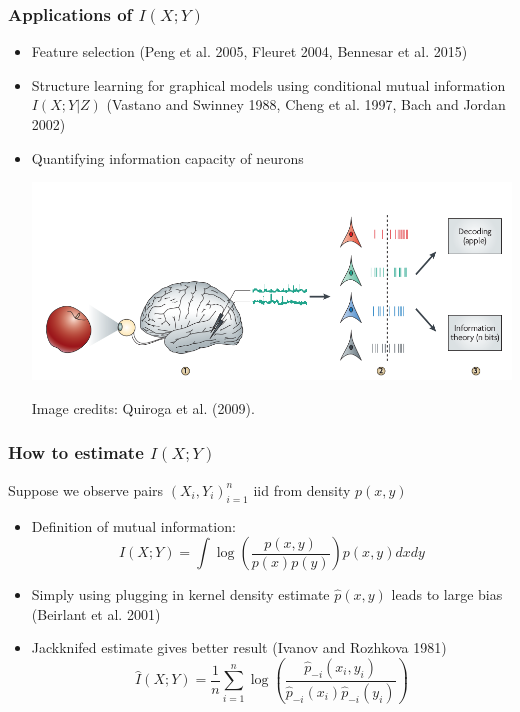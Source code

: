 \documentclass{beamer}
\begin{document}
\begin{frame}
\frametitle{Applications of $I(X; Y)$} 
\begin{itemize}
\item Feature selection (Peng et al. 2005, Fleuret 2004, Bennesar et al. 2015)
\item Structure learning for graphical models using conditional mutual information $I(X; Y|Z)$
(Vastano and Swinney 1988, Cheng et al. 1997, Bach and Jordan 2002)
\item Quantifying information capacity of neurons
\begin{center}
\includegraphics[scale = 0.2]{quiroga.png}
\end{center}
\tiny{Image credits: Quiroga et al. (2009).}
\end{itemize}
\end{frame}

\begin{frame}
\frametitle{How to estimate $I(X; Y)$}
Suppose we observe pairs $(X_i,Y_i)_{i=1}^n$ iid from density $p(x, y)$
\begin{itemize}
\item Definition of mutual information:
\[
I(X; Y) = \int \log \left(\frac{p(x, y)}{p(x)p(y)}\right) p(x, y) dx dy
\]
\item Simply using plugging in kernel density estimate $\hat{p}(x, y)$ leads to large bias (Beirlant et al. 2001)
\item Jackknifed estimate gives better result (Ivanov and Rozhkova 1981)
\[
\hat{I}(X; Y) = \frac{1}{n} \sum_{i=1}^n \log \left(\frac{\hat{p}_{-i}(x_i, y_i)}{\hat{p}_{-i}(x_i)\hat{p}_{-i}(y_i)}\right)
\]
\end{itemize}
\end{frame}
\end{document}
